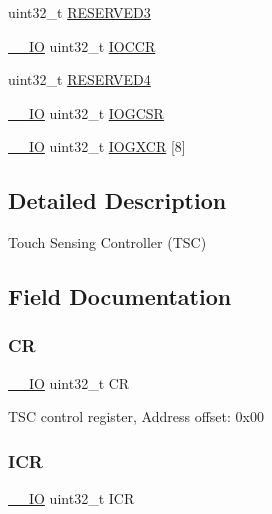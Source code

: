 \begin{DoxyCompactItemize}
\item 
uint32\+\_\+t \hyperlink{struct_t_s_c___type_def_af2b40c5e36a5e861490988275499e158}{R\+E\+S\+E\+R\+V\+E\+D3}
\item 
\hyperlink{core__sc300_8h_aec43007d9998a0a0e01faede4133d6be}{\+\_\+\+\_\+\+IO} uint32\+\_\+t \hyperlink{struct_t_s_c___type_def_a86d0ebb96aba44d9cf4ca082924bd2e5}{I\+O\+C\+CR}
\item 
uint32\+\_\+t \hyperlink{struct_t_s_c___type_def_ac0018930ee9f18afda25b695b9a4ec16}{R\+E\+S\+E\+R\+V\+E\+D4}
\item 
\hyperlink{core__sc300_8h_aec43007d9998a0a0e01faede4133d6be}{\+\_\+\+\_\+\+IO} uint32\+\_\+t \hyperlink{struct_t_s_c___type_def_a3e7f82c383f073dd71524bda07a7d76d}{I\+O\+G\+C\+SR}
\item 
\hyperlink{core__sc300_8h_aec43007d9998a0a0e01faede4133d6be}{\+\_\+\+\_\+\+IO} uint32\+\_\+t \hyperlink{struct_t_s_c___type_def_a517b87daa59a395d1ba68fd9600ec6a1}{I\+O\+G\+X\+CR} \mbox{[}8\mbox{]}
\end{DoxyCompactItemize}


\subsection{Detailed Description}
Touch Sensing Controller (T\+SC) 

\subsection{Field Documentation}
\mbox{\label{struct_t_s_c___type_def_ab40c89c59391aaa9d9a8ec011dd0907a}} 
\subsubsection{\texorpdfstring{CR}{CR}}
{\footnotesize\ttfamily \hyperlink{core__sc300_8h_aec43007d9998a0a0e01faede4133d6be}{\+\_\+\+\_\+\+IO} uint32\+\_\+t CR}

T\+SC control register, Address offset\+: 0x00 \mbox{\label{struct_t_s_c___type_def_a0a8c8230846fd8ff154b9fde8dfa0399}} 
\subsubsection{\texorpdfstring{I\+CR}{ICR}}
{\footnotesize\ttfamily \hyperlink{core__sc300_8h_aec43007d9998a0a0e01faede4133d6be}{\+\_\+\+\_\+\+IO} uint32\+\_\+t I\+CR}

